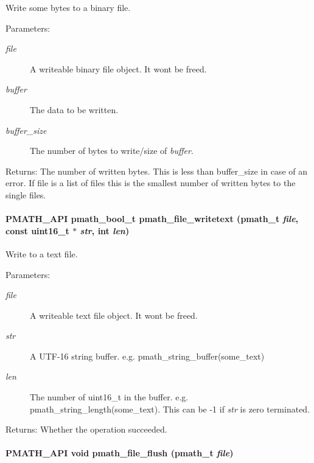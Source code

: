 Write some bytes to a binary file. 

\begin{Desc}
\item[Parameters:]
\begin{description}
\item[{\em file}]A writeable binary file object. It wont be freed. \item[{\em buffer}]The data to be written. \item[{\em buffer\_\-size}]The number of bytes to write/size of {\em buffer\/}. \end{description}
\end{Desc}
\begin{Desc}
\item[Returns:]The number of written bytes. This is less than buffer\_\-size in case of an error. If file is a list of files this is the smallest number of written bytes to the single files. \end{Desc}
\hypertarget{group__file__api_g09096caebfcdfeb74c8f3845ff2ff262}{
\paragraph[{pmath\_\-file\_\-writetext}]{\setlength{\rightskip}{0pt plus 5cm}PMATH\_\-API {\bf pmath\_\-bool\_\-t} pmath\_\-file\_\-writetext ({\bf pmath\_\-t} {\em file}, \/  const uint16\_\-t $\ast$ {\em str}, \/  int {\em len})}\hfill}
\label{group__file__api_g09096caebfcdfeb74c8f3845ff2ff262}


Write to a text file. 

\begin{Desc}
\item[Parameters:]
\begin{description}
\item[{\em file}]A writeable text file object. It wont be freed. \item[{\em str}]A UTF-16 string buffer. e.g. pmath\_\-string\_\-buffer(some\_\-text) \item[{\em len}]The number of uint16\_\-t in the buffer. e.g. pmath\_\-string\_\-length(some\_\-text). This can be -1 if {\em str\/} is zero terminated. \end{description}
\end{Desc}
\begin{Desc}
\item[Returns:]Whether the operation succeeded. \end{Desc}
\hypertarget{group__file__api_g039eb11d9dd85af6699565c6f0f0daa1}{
\paragraph[{pmath\_\-file\_\-flush}]{\setlength{\rightskip}{0pt plus 5cm}PMATH\_\-API void pmath\_\-file\_\-flush ({\bf pmath\_\-t} {\em file})}\hfill}
\label{group__file__api_g039eb11d9dd85af6699565c6f0f0daa1}


